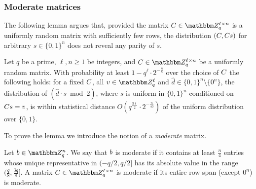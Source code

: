 \subsubsection{Moderate matrices}
\label{sec:moderate}

The following lemma argues that, provided the matrix $\*C \in\mZ_q^{\ell\times n}$ is a uniformly random matrix with sufficiently few rows, the distribution $(\*C,\*C\*s)$ for arbitrary $s \in \{0,1\}^n$ does not reveal any parity of $s$.  

\begin{lemma}\label{lem:hardcore-1}
Let $q$ be a prime, $\ell,n\geq 1$ be integers, and $\*C\in \mZ_q^{\ell\times n}$ be a uniformly random matrix. With probability at least $1-q^\ell\cdot 2^{-\frac{n}{8}}$ over the choice of $\*C$ the following holds: for a fixed $\*C$, all $\*v\in\mZ_q^\ell$ and $\hat{d}\in \{0,1\}^n\setminus\{0^n\}$, the distribution of $(\hat{d}\cdot s \bmod 2)$, where $s$ is uniform in $\{0,1\}^n$ conditioned on $\*C\*s = \*v$, is within  statistical distance $O(q^{\frac{3\ell}{2}} \cdot 2^{-\frac{n}{40}})$ of the uniform distribution over $\{0,1\}$. 
\end{lemma}

To prove the lemma we introduce the notion of a \emph{moderate} matrix.  

\begin{definition}\label{def:moderate}
Let $\*b\in \mZ_q^n$. We say that $\*b$ is \textnormal{moderate} if it contains at least $\frac{n}{4}$ entries whose unique representative in $(-q/2,q/2]$ has its absolute value in the range $(\frac{q}{8},\frac{3q}{8}]$. A matrix $\*C\in \mZ_q^{\ell\times n}$ is moderate if its entire row span (except $0^n$) is moderate.
\end{definition}

